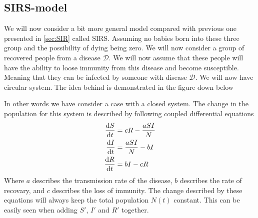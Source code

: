 \documentclass[a4paper, 10pt]{article}
\begin{document}
\subsection{SIRS-model}\label{sec:SIRS}
We will now consider a bit more general model compared with previous one presented in \eqref{sec:SIR} called SIRS.
Assuming no babies born into these three group and the possibility of dying being zero.
We will now consider a group of recovered people from a disease $\mathcal{D}$. We will now assume that these
people will have the ability to loose immunity from this disease and become susceptible. Meaning that they can
be infected by someone with disease $\mathcal{D}$.
We will now have circular system. The idea behind is demonstrated in the figure down below
\begin{center}
\end{center}
In other words we have consider a case with a closed system. The change in the population for this system is described by following
coupled differential equations
\begin{align}
  \dv{S}{t} &= cR - \frac{aSI}{N} \\
  \dv{I}{t} &= \frac{aSI}{N} - bI \\
  \dv{R}{t} &= bI - cR
  \label{sirs}
\end{align}
Where $a$ describes the transmission rate of the disease, $b$ describes the rate of recovary, and $c$
describes the loss of immunity. The change described by these equations will always keep the
total population $N(t)$ constant. This can be easily seen when adding $S'$, $I'$ and $R'$ together.
\end{document}
